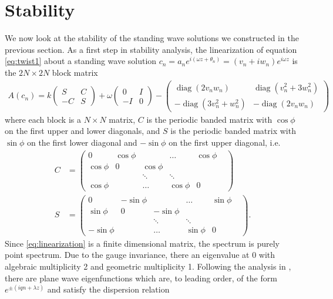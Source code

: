 \documentclass[12pt,reqno]{amsart}
\DeclareMathOperator{\diag}{diag}
\begin{document}
\section{Stability}\label{sec:stability}

We now look at the stability of the standing wave solutions we constructed in the previous section. As a first step in stability analysis, the linearization of equation \cref{eq:twist1} about a standing wave solution $c_n = a_n e^{i (\omega z + \theta_n) } = (v_n + i w_n)e^{i\omega z}$ is the $2N \times 2N$ block matrix
\begin{align}\label{eq:linearization}
A(c_n) =
k \begin{pmatrix}S & C \\ -C & S \end{pmatrix}
+ \omega\begin{pmatrix}0 & I \\ -I & 0 \end{pmatrix} 
- \begin{pmatrix} \diag(2v_n w_n) & \diag(v_n^2 + 3 w_n^2) \\
-\diag(3 v_n^2 + w_n^2) & -\diag(2v_n w_n) \end{pmatrix}
\end{align}
where each block is a $N\times N$ matrix, $C$ is the periodic banded matrix with $\cos \phi$ on the first upper and lower diagonals, and $S$ is the periodic banded matrix with $\sin \phi$ on the first lower diagonal and $-\sin \phi$ on the first upper diagonal, i.e.
\begin{align*}
C &= \begin{pmatrix}
0 & \cos \phi & & \dots & \cos \phi \\
\cos \phi & 0 & \cos \phi & & & \\
& & \ddots & \ddots &  & \\
\cos \phi & & \dots & \cos \phi & 0
\end{pmatrix} \\
S &= \begin{pmatrix}
0 & -\sin \phi & & \dots & \sin \phi \\
\sin \phi & 0 & -\sin \phi & & & \\
& & \ddots & \ddots &  & \\
-\sin \phi & & \dots & \sin \phi & 0
\end{pmatrix}.
\end{align*}
Since \cref{eq:linearization} is a finite dimensional matrix, the spectrum is purely point spectrum. Due to the gauge invariance, there an eigenvalue at 0 with algebraic multiplicity 2 and geometric multiplicity 1. Following the analysis in \cite[Section 2.1.1.1]{Kevrekidis2009}, there are plane wave eigenfunctions which are, to leading order, of the form $e^{\pm( i q n + \lambda z)}$ and satisfy the dispersion relation
\end{document}
